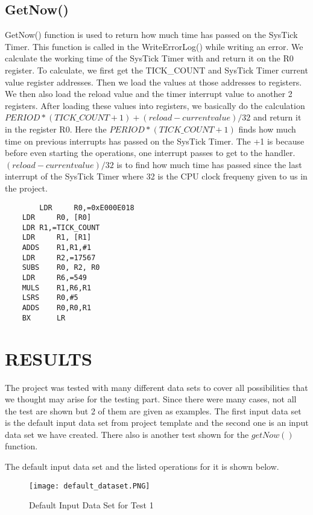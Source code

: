 \documentclass[pdftex,12pt,a4paper]{article}
\begin{document}
\subsection{GetNow()}

GetNow() function is used to return how much time has passed on the SysTick Timer. This function is called in the WriteErrorLog() while writing an error. We calculate the working time of the SysTick Timer with and return it on the R0 register. To calculate, we first get the TICK\_COUNT and SysTick Timer current value register addresses. Then we load the values at those addresses to registers. We then also load the reload value and the timer interrupt value to another 2 registers. After loading these values into registers, we basically do the calculation $PERIOD*(TICK\_COUNT+1) + (reload - current value)/32$ and return it in the register R0. Here the $PERIOD*(TICK\_COUNT+1)$ finds how much time on previous interrupts has passed on the SysTick Timer. The +1 is because before even starting the operations, one interrupt passes to get to the handler. $(reload-current value)/32$ is to find how much time has passed since the last interrupt of the SysTick Timer where 32 is the CPU clock frequeny given to us in the project.

\begin{lstlisting}
        LDR     R0,=0xE000E018			
	LDR     R0, [R0]					
	LDR	R1,=TICK_COUNT				
	LDR     R1, [R1]					
	ADDS    R1,R1,#1					
	LDR     R2,=17567					
	SUBS    R0, R2, R0					
	LDR     R6,=549					
	MULS    R1,R6,R1				
	LSRS    R0,#5						
	ADDS    R0,R0,R1					
	BX      LR
\end{lstlisting}
\section{RESULTS}

The project was tested with many different data sets to cover all possibilities that we thought may arise for the testing part. Since there were many cases, not all the test are shown but 2 of them are given as examples. The first input data set is the default input data set from project template and the second one is an input data set we have created. There also is another test shown for the $getNow()$ function.

The default input data set and the listed operations for it is shown below.

\begin{figure}[H]
	\centering
	\texttt{[image: default\_dataset.PNG]}	
	\caption{Default Input Data Set for Test 1}
	\label{fig1}
\end{figure}
\end{document}
